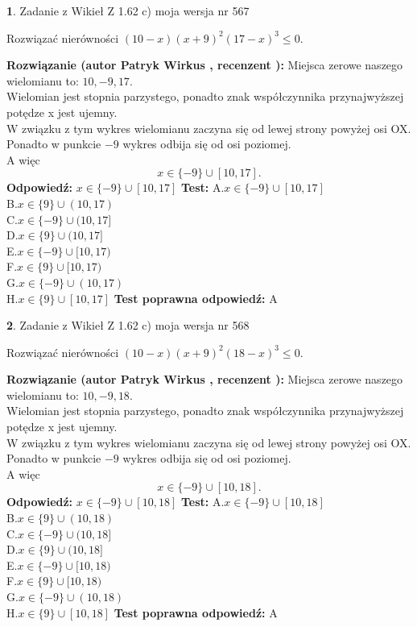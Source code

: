 \documentclass[12pt, a4paper]{article}
\theoremstyle{definition} %
\newtheorem{zad}{}
\newcommand{\zadStart}[1]{\begin{zad}#1\newline}
\newcommand{\zadStop}{\end{zad}}
\newcommand{\rozwStart}[2]{\noindent \textbf{Rozwiązanie (autor #1 , recenzent #2): }\newline}
\newcommand{\rozwStop}{\newline}
\newcommand{\odpStart}{\noindent \textbf{Odpowiedź:}\newline}
\newcommand{\odpStop}{\newline}
\newcommand{\testStart}{\noindent \textbf{Test:}\newline}
\newcommand{\testStop}{\newline}
\newcommand{\kluczStart}{\noindent \textbf{Test poprawna odpowiedź:}\newline}
\newcommand{\kluczStop}{\newline}
\begin{document}
\zadStart{Zadanie z Wikieł Z 1.62 c) moja wersja nr 567}

Rozwiązać nierówności $(10-x)(x+9)^{2}(17-x)^{3}\le0$.
\zadStop
\rozwStart{Patryk Wirkus}{}
Miejsca zerowe naszego wielomianu to: $10, -9, 17$.\\
Wielomian jest stopnia parzystego, ponadto znak współczynnika przy\linebreak najwyższej potędze x jest ujemny.\\ W związku z tym wykres wielomianu zaczyna się od lewej strony powyżej osi OX.\\
Ponadto w punkcie $-9$ wykres odbija się od osi poziomej.\\
A więc $$x \in \{-9\} \cup [10,17].$$
\rozwStop
\odpStart
$x \in \{-9\} \cup [10,17]$
\odpStop
\testStart
A.$x \in \{-9\} \cup [10,17]$\\
B.$x \in \{9\} \cup (10,17)$\\
C.$x \in \{-9\} \cup (10,17]$\\
D.$x \in \{9\} \cup (10,17]$\\
E.$x \in \{-9\} \cup [10,17)$\\
F.$x \in \{9\} \cup [10,17)$\\
G.$x \in \{-9\} \cup (10,17)$\\
H.$x \in \{9\} \cup [10,17]$
\testStop
\kluczStart
A
\kluczStop



\zadStart{Zadanie z Wikieł Z 1.62 c) moja wersja nr 568}

Rozwiązać nierówności $(10-x)(x+9)^{2}(18-x)^{3}\le0$.
\zadStop
\rozwStart{Patryk Wirkus}{}
Miejsca zerowe naszego wielomianu to: $10, -9, 18$.\\
Wielomian jest stopnia parzystego, ponadto znak współczynnika przy\linebreak najwyższej potędze x jest ujemny.\\ W związku z tym wykres wielomianu zaczyna się od lewej strony powyżej osi OX.\\
Ponadto w punkcie $-9$ wykres odbija się od osi poziomej.\\
A więc $$x \in \{-9\} \cup [10,18].$$
\rozwStop
\odpStart
$x \in \{-9\} \cup [10,18]$
\odpStop
\testStart
A.$x \in \{-9\} \cup [10,18]$\\
B.$x \in \{9\} \cup (10,18)$\\
C.$x \in \{-9\} \cup (10,18]$\\
D.$x \in \{9\} \cup (10,18]$\\
E.$x \in \{-9\} \cup [10,18)$\\
F.$x \in \{9\} \cup [10,18)$\\
G.$x \in \{-9\} \cup (10,18)$\\
H.$x \in \{9\} \cup [10,18]$
\testStop
\kluczStart
A
\kluczStop
\end{document}
